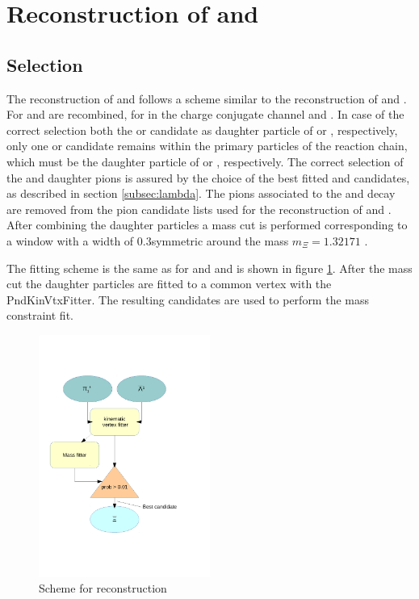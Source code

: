 		
		
		
	
\section{Reconstruction of \cascade and \anticascade}
	\subsection*{Selection}
		The reconstruction of \cascade and \anticascade follows a scheme similar to the reconstruction of \lam and \alam.
		For \anticascade \alam and \piplus are recombined, for \cascade in the charge conjugate channel \lam and \piminus.
		In case of the correct selection both the \piminus or \piplus candidate as daughter particle of \lam or \alam, respectively,
		only one \piminus or \piplus candidate remains within the primary particles of the reaction chain, which must be the daughter 
		particle of \cascade or \anticascade, respectively.
		The correct selection of the \lam and \alam daughter pions is assured by the choice of the best fitted \lam and \alam candidates, 
		as described in section \ref{subsec:lambda}.
		The pions associated to the \lam and \alam decay are removed from the pion candidate lists used for the reconstruction of \cascade and \anticascade .
		After combining the daughter particles a mass cut is performed corresponding to a window with a width of $0.3$\massunit symmetric around 
		the \cascade mass $m_{\Xi} = 1.32171$ \massunit \cite{PDG}.
		 
		The fitting scheme is the same as for \lam and \alam and is shown in figure \ref{fig:anticascade_scheme}.
		After the mass cut the daughter particles are fitted to a common vertex with the PndKinVtxFitter.
		The resulting candidates are used to perform the mass constraint fit. 
		
		\begin{figure}
			\centering
				\includegraphics[width=0.50\textwidth]{./plots/combineAntiCascade.pdf}
			\caption{\propose Scheme for \anticascade reconstruction}
			\label{fig:anticascade_scheme}
		\end{figure}
		

